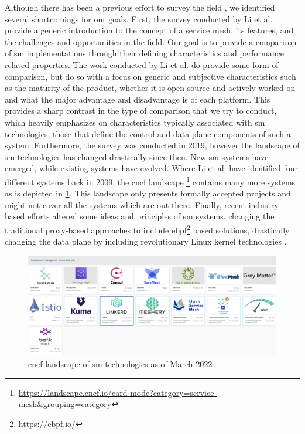 Although there has been a previous effort to survey the field \cite{service-mesh-survey}, we identified several shortcomings for our goals. First, the survey conducted by Li et al. provide a generic introduction to the concept of a service mesh, its features, and the challenges and opportunities in the field. Our goal is to provide a comparison of \gls{sm} implementations through their defining characteristics and performance related properties. The work conducted by Li et al. do provide some form of comparison, but do so with a focus on generic and subjective characteristics such as the maturity of the product, whether it is open-source and actively worked on and what the major advantage and disadvantage is of each platform. This provides a sharp contrast in the type of comparison that we try to conduct, which heavily emphasizes on characteristics typically associated with  \gls{sm} technologies, those that define the control and data plane components of such a system. Furthermore, the survey was conducted in 2019, however the landscape of \gls{sm} technologies has changed drastically since then. New \gls{sm} systems have emerged, while existing systems have evolved. Where Li et al. \cite{service-mesh-survey} have identified four different systems back in 2009, the \gls{cncf} landscape \cite{cncf-landscape}\footnote{\url{https://landscape.cncf.io/card-mode?category=service-mesh&grouping=category}} contains many more systems as is depicted in \cref{fig:cncf-landscape-sm}. This landscape only presents formally accepted projects and might not cover all the systems which are out there. Finally, recent industry-based efforts altered some ideas and principles of \gls{sm} systems, changing the traditional proxy-based approaches to include  \gls{ebpf}\footnote{\url{https://ebpf.io/}} based solutions, drastically changing the data plane by including revolutionary Linux kernel technologies \cite{istio-merbridge, cilium-mesh}.


\begin{figure}[t]
    \centering
    \includegraphics[width=0.9\linewidth]{3_systems_survey/figures/cncf-landscape-service-mesh}
    \caption[CNCF landscape of \gls{sm} technologies]{\gls{cncf} landscape of \gls{sm} technologies as of March 2022}
    \label{fig:cncf-landscape-sm}
\end{figure}

